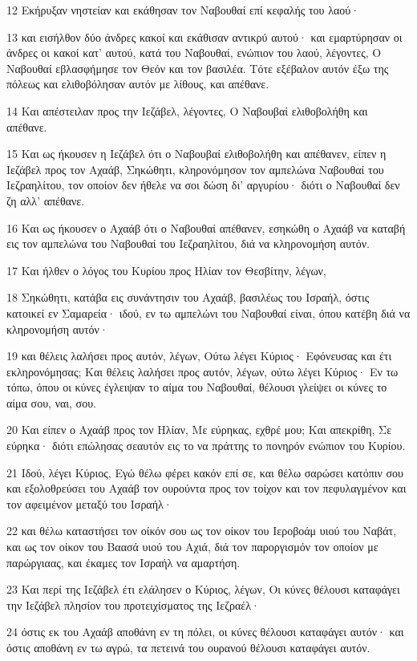 \par 12 Εκήρυξαν νηστείαν και εκάθησαν τον Ναβουθαί επί κεφαλής του λαού·
\par 13 και εισήλθον δύο άνδρες κακοί και εκάθισαν αντικρύ αυτού· και εμαρτύρησαν οι άνδρες οι κακοί κατ' αυτού, κατά του Ναβουθαί, ενώπιον του λαού, λέγοντες, Ο Ναβουθαί εβλασφήμησε τον Θεόν και τον βασιλέα. Τότε εξέβαλον αυτόν έξω της πόλεως και ελιθοβόλησαν αυτόν με λίθους, και απέθανε.
\par 14 Και απέστειλαν προς την Ιεζάβελ, λέγοντες, Ο Ναβουβαί ελιθοβολήθη και απέθανε.
\par 15 Και ως ήκουσεν η Ιεζάβελ ότι ο Ναβουβαί ελιθοβολήθη και απέθανεν, είπεν η Ιεζάβελ προς τον Αχαάβ, Σηκώθητι, κληρονόμησον τον αμπελώνα Ναβουθαί του Ιεζραηλίτου, τον οποίον δεν ήθελε να σοι δώση δι' αργυρίου· διότι ο Ναβουθαί δεν ζη αλλ' απέθανε.
\par 16 Και ως ήκουσεν ο Αχαάβ ότι ο Ναβουθαί απέθανεν, εσηκώθη ο Αχαάβ να καταβή εις τον αμπελώνα του Ναβουθαί του Ιεζραηλίτου, διά να κληρονομήση αυτόν.
\par 17 Και ήλθεν ο λόγος του Κυρίου προς Ηλίαν τον Θεσβίτην, λέγων,
\par 18 Σηκώθητι, κατάβα εις συνάντησιν του Αχαάβ, βασιλέως του Ισραήλ, όστις κατοικεί εν Σαμαρεία· ιδού, εν τω αμπελώνι του Ναβουθαί είναι, όπου κατέβη διά να κληρονομήση αυτόν·
\par 19 και θέλεις λαλήσει προς αυτόν, λέγων, Ούτω λέγει Κύριος· Εφόνευσας και έτι εκληρονόμησας; Και θέλεις λαλήσει προς αυτόν, λέγων, ούτω λέγει Κύριος· Εν τω τόπω, όπου οι κύνες έγλειψαν το αίμα του Ναβουθαί, θέλουσι γλείψει οι κύνες το αίμα σου, ναι, σου.
\par 20 Και είπεν ο Αχαάβ προς τον Ηλίαν, Με εύρηκας, εχθρέ μου; Και απεκρίθη, Σε εύρηκα· διότι επώλησας σεαυτόν εις το να πράττης το πονηρόν ενώπιον του Κυρίου.
\par 21 Ιδού, λέγει Κύριος, Εγώ θέλω φέρει κακόν επί σε, και θέλω σαρώσει κατόπιν σου και εξολοθρεύσει του Αχαάβ τον ουρούντα προς τον τοίχον και τον πεφυλαγμένον και τον αφειμένον μεταξύ του Ισραήλ·
\par 22 και θέλω καταστήσει τον οίκόν σου ως τον οίκον του Ιεροβοάμ υιού του Ναβάτ, και ως τον οίκον του Βαασά υιού του Αχιά, διά τον παροργισμόν τον οποίον με παρώργιαας, και έκαμες τον Ισραήλ να αμαρτήση.
\par 23 Και περί της Ιεζάβελ έτι ελάλησεν ο Κύριος, λέγων, Οι κύνες θέλουσι καταφάγει την Ιεζάβελ πλησίον του προτειχίσματος της Ιεζραέλ·
\par 24 όστις εκ του Αχαάβ αποθάνη εν τη πόλει, οι κύνες θέλουσι καταφάγει αυτόν· και όστις αποθάνη εν τω αγρώ, τα πετεινά του ουρανού θέλουσι καταφάγει αυτόν.
